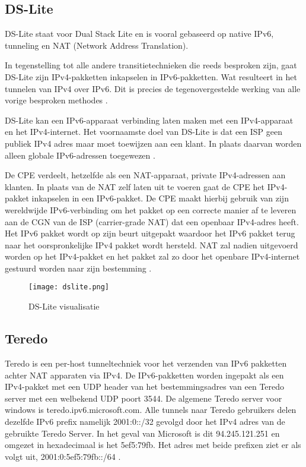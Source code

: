 \subsection{DS-Lite}

DS-Lite staat voor Dual Stack Lite en is vooral gebaseerd op native IPv6, tunneling en NAT (Network Address Translation).

In tegenstelling tot alle andere transitietechnieken die reeds besproken zijn, gaat DS-Lite zijn IPv4-pakketten inkapselen in IPv6-pakketten. Wat resulteert in het tunnelen van IPv4 over IPv6. Dit is precies de tegenovergestelde werking van alle vorige besproken methodes \autocite{RIPE2016}.

DS-Lite kan een IPv6-apparaat verbinding laten maken met een IPv4-apparaat en het IPv4-internet. Het voornaamste doel van DS-Lite is dat een ISP geen publiek IPv4 adres maar moet toewijzen aan een klant. In plaats daarvan worden alleen globale IPv6-adressen toegewezen \autocite{RIPE2016}.

De CPE verdeelt, hetzelfde als een NAT-apparaat, private IPv4-adressen aan klanten. In plaats van de NAT zelf laten uit te voeren gaat de CPE het IPv4-pakket inkapselen in een IPv6-pakket. De CPE maakt hierbij gebruik van zijn wereldwijde IPv6-verbinding om het pakket op een correcte manier af te leveren aan de CGN van de ISP (carrier-grade NAT) dat een openbaar IPv4-adres heeft. Het IPv6 pakket wordt op zijn beurt uitgepakt waardoor het IPv6 pakket terug naar het oorspronkelijke IPv4 pakket wordt hersteld. NAT zal nadien uitgevoerd worden op het IPv4-pakket en het pakket zal zo door het openbare IPv4-internet gestuurd worden naar zijn bestemming \autocite{RIPE2016}. 

\begin{figure}
\centering
\texttt{[image: dslite.png]}
\caption{DS-Lite visualisatie \autocite{RIPE2016}}
\end{figure}

\subsection{Teredo}

Teredo is een per-host tunneltechniek voor het verzenden van IPv6 pakketten achter NAT apparaten via IPv4. De IPv6-pakketten worden ingepakt als een IPv4-pakket met een UDP header van het bestemmingsadres van een Teredo server met een welbekend UDP poort 3544. De algemene Teredo server voor windows is teredo.ipv6.microsoft.com. Alle tunnels naar Teredo gebruikers delen dezelfde IPv6 prefix namelijk 2001:0::/32 gevolgd door het IPv4 adres van de gebruikte Teredo Server. In het geval van Microsoft is dit 94.245.121.251 en omgezet in hexadecimaal is het 5ef5:79fb. Het adres met beide prefixen ziet er als volgt uit, 2001:0:5ef5:79fb::/64 \autocite{Vinciguerra2013}.

